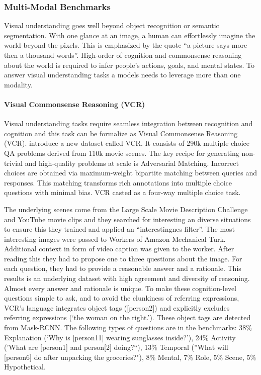 \documentclass[
]{krantz}
\begin{document}
\hypertarget{multi-modal-benchmarks}{%
\subsubsection{Multi-Modal Benchmarks}\label{multi-modal-benchmarks}}

Visual understanding goes well beyond object recognition or semantic segmentation. With one glance at an image, a human can effortlessly imagine the world beyond the pixels. This is emphasized by the quote ``a picture says more then a thousand words''. High-order of cognition and commonsense reasoning about the world is required to infer people's actions, goals, and mental states. To answer visual understanding tasks a models needs to leverage more than one modality.

\hypertarget{visual-commonsense-reasoning-vcr}{%
\paragraph{Visual Commonsense Reasoning (VCR)}\label{visual-commonsense-reasoning-vcr}}

Visual understanding tasks require seamless integration between recognition and cognition and this task can be formalize as Visual Commonsense Reasoning (VCR). \citet{zellers2019recognition} introduce a new dataset called VCR. It consists of 290k multiple choice QA problems derived from 110k movie scenes. The key recipe for generating non-trivial and high-quality problems at scale is Adversarial Matching. Incorrect choices are obtained via maximum-weight bipartite matching between queries and responses. This matching transforms rich annotations into multiple choice questions with minimal bias. VCR casted as a four-way multiple choice task.

The underlying scenes come from the Large Scale Movie Description Challenge and YouTube movie clips and they searched for interesting an diverse situations to ensure this they trained and applied an ``interestingnes filter''. The most interesting images were passed to Workers of Amazon Mechanical Turk. Additional context in form of video caption was given to the worker. After reading this they had to propose one to three questions about the image. For each question, they had to provide a reasonable answer and a rationale. This results is an underlying dataset with high agreement and diversity of reasoning. Almost every answer and rationale is unique. To make these cognition-level questions simple to ask, and to avoid the clunkiness of referring expressions, VCR's language integrates object tags ({[}person2{]}) and explicitly excludes referring expressions (`the woman on the right.'). These object tags are detected from Mask-RCNN. The following types of questions are in the benchmarks: 38\% Explanation (`Why is {[}person11{]} wearing sunglasses inside?'), 24\% Activity ('What are {[}person1{]} and person{[}2{]} doing?``), 13\% Temporal (''What will {[}person6{]} do after unpacking the groceries?"), 8\% Mental, 7\% Role, 5\% Scene, 5\% Hypothetical.
\end{document}
